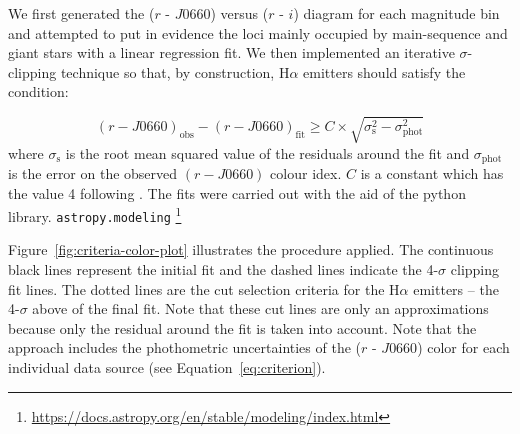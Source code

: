 \documentclass[fleqn,usenatbib]{mnras}
\newcommand{\comment}[1]{\textcolor{red}{#1}}
\newcommand{\luis}[1]{\textcolor{magenta}{#1}}
\begin{document}
We first generated the ($r$ - $J0660$) versus ($r$ - $i$)
diagram for each magnitude bin and attempted to put in evidence the loci mainly 
occupied by main-sequence and giant stars with a linear regression fit. 
We then implemented an iterative $\sigma$-clipping technique so that, by construction, H$\alpha$ emitters should satisfy the condition: %

\begin{equation}
  (r - J0660)_{\mathrm{obs}} - (r - J0660)_{\mathrm{fit}} \geq C \times \sqrt{\sigma^2_{\mathrm{s}} - \sigma^2_{\mathrm{phot}}}
  \label{eq:criterion}
\end{equation}
 where $\sigma_{\mathrm{s}}$ is the root mean squared value of the residuals around
 the fit and $\sigma_{\mathrm{phot}}$ is the error on the observed $(r - J0660)$ colour idex.
 $C$ is a constant which has the value 4 following \citet{Wevers:2017}.
The fits were carried out with the aid of the python library. \texttt{astropy.modeling}
\footnote{\url{https://docs.astropy.org/en/stable/modeling/index.html}}

Figure~\ref{fig:criteria-color-plot} illustrates the procedure applied. The continuous black lines represent the initial
fit and  the dashed lines indicate the 4-$\sigma$ clipping fit lines. The dotted lines are
the cut selection criteria for the H{$\alpha$} emitters -- the 4-$\sigma$ above of the final
fit. Note that these cut lines are only an approximations because only the residual around the fit is taken into account. 
Note that the approach includes the phothometric uncertainties of the ($r$ - $J0660$) color for each
individual data source (see Equation~\ref{eq:criterion}).
\end{document}
